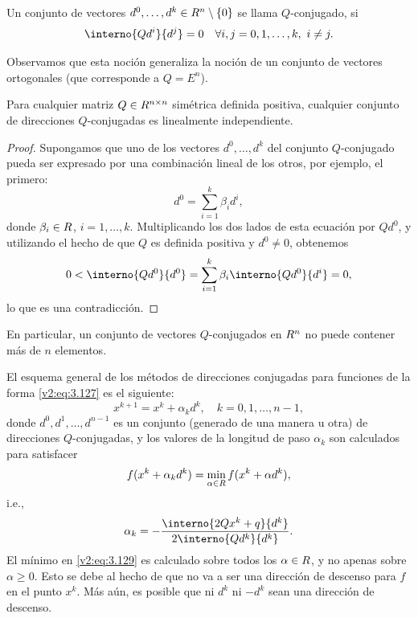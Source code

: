 \begin{definition}\label{v2:def:3.4.1}
    Un conjunto de vectores $d^0, \dots, d^k \in R^n \setminus \{0\}$ se llama $Q$-conjugado, si
    \[
        \interno{Qd^i}{d^j} = 0 \quad \forall i, j = 0, 1, \dots, k, \ i \neq j.
    \]
\end{definition}

Observamos que esta noción generaliza la noción de un conjunto de vectores ortogonales (que corresponde a $Q = E^n$).

\begin{lemma}\label{v2:lem:3.4.1}
    Para cualquier matriz $Q \in R^{n \times n}$ simétrica definida positiva, cualquier conjunto de direcciones $Q$-conjugadas es linealmente independiente.
\end{lemma}

\begin{proof}
    Supongamos que uno de los vectores $d^0, \dots, d^k$ del conjunto $Q$-conjugado pueda ser expresado por una combinación lineal de los otros, por ejemplo, el primero:
    \[
        d^0 = \sum_{i=1}^k \beta_i d^i,
    \]
    donde $\beta_i \in R$, $i = 1, \dots, k$. Multiplicando los dos lados de esta ecuación por $Qd^0$, y utilizando el hecho de que $Q$ es definida positiva y $d^0 \neq 0$, obtenemos
    \[
        0 < \interno{Qd^0}{d^0} = \sum_{i=1}^k \beta_i \interno{Qd^0}{d^i} = 0,
    \]
    lo que es una contradicción.
\end{proof}

En particular, un conjunto de vectores $Q$-conjugados en $R^n$ no puede contener más de $n$ elementos.

El esquema general de los métodos de direcciones conjugadas para funciones de la forma \eqref{v2:eq:3.127} es el siguiente:
\begin{equation}
    x^{k+1} = x^k + \alpha_k d^k, \quad k = 0, 1, \dots, n - 1,
    \label{v2:eq:3.128}
\end{equation}
donde $d^0, d^1, \dots, d^{n-1}$ es un conjunto (generado de una manera u otra) de direcciones $Q$-conjugadas, y los valores de la longitud de paso $\alpha_k$ son calculados para satisfacer
\begin{equation}
    f(x^k + \alpha_k d^k) = \min_{\alpha \in R} f(x^k + \alpha d^k),
    \label{v2:eq:3.129}
\end{equation}
i.e.,
\begin{equation}
    \alpha_k = - \frac{\interno{2Qx^k + q}{d^k}}{2\interno{Qd^k}{d^k}}.
    \label{v2:eq:3.130}
\end{equation}
El mínimo en \eqref{v2:eq:3.129} es calculado sobre todos los $\alpha \in R$, y no apenas sobre $\alpha \ge 0$. Esto se debe al hecho de que no va a ser una dirección de descenso para $f$ en el punto $x^k$. Más aún, es posible que ni $d^k$ ni $-d^k$ sean una dirección de descenso.

